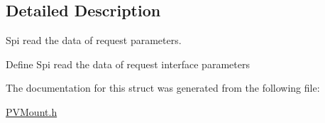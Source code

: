 \subsection{Detailed Description}
Spi read the data of request parameters. 

Define Spi read the data of request interface parameters 

The documentation for this struct was generated from the following file\+:\begin{DoxyCompactItemize}
\item 
\hyperlink{_p_v_mount_8h}{P\+V\+Mount.\+h}\end{DoxyCompactItemize}
